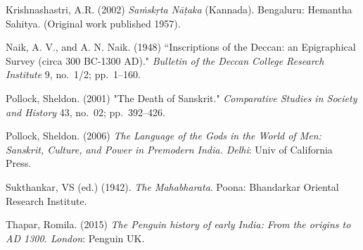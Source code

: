 \begin{thebibliography}{99}
Krishnashastri, A.R. (2002) {\sl Saṁskṛta Nāṭaka} (Kannada). Bengaluru: Hemantha Sahitya. (Original work published 1957).

Naik, A. V., and A. N. Naik. (1948) “Inscriptions of the Deccan: an Epigraphical Survey (circa 300 BC-1300 AD)." {\sl Bulletin of the Deccan College Research Institute} 9, no.~1/2; pp.~1--160.

Pollock, Sheldon. (2001) "The Death of Sanskrit." {\sl Comparative Studies in Society and History} 43, no.~02; pp.~392--426.

Pollock, Sheldon. (2006) {\sl The Language of the Gods in the World of Men: Sanskrit, Culture, and Power in Premodern India. Delhi}: Univ of California Press.

Sukthankar, VS  (ed.) (1942). {\sl The Mahabharata}. Poona: Bhandarkar Oriental Research Institute.

Thapar, Romila. (2015) {\sl The Penguin history of early India: From the origins to AD 1300. London}: Penguin UK.

\end{thebibliography}
